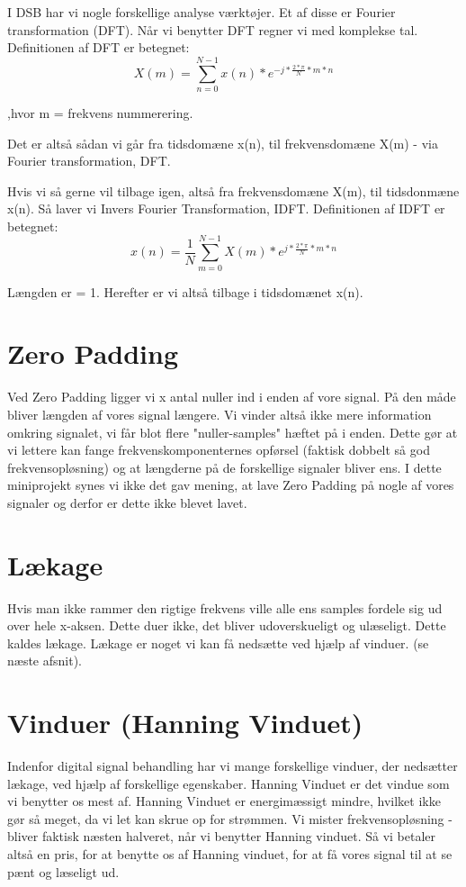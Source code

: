 \documentclass[12pt, letterpaper]{article}
\begin{document}
I DSB har vi nogle forskellige analyse værktøjer. Et af disse er Fourier transformation (DFT). Når vi benytter DFT regner vi med komplekse tal. 
Definitionen af DFT er betegnet: 
$$X(m)= \sum\limits_{n=0}^{N-1} x(n)*e^{-j*\frac{2*\pi}{N}*m*n}$$

,hvor m = frekvens nummerering. 


Det er altså sådan vi går fra tidsdomæne x(n), til frekvensdomæne X(m) - via Fourier transformation, DFT. 

Hvis vi så gerne vil tilbage igen, altså fra frekvensdomæne X(m), til tidsdonmæne x(n). Så laver vi Invers Fourier Transformation, IDFT. 
Definitionen af IDFT er betegnet: 
$$x(n)= \frac{1}{N} \sum\limits_{m=0}^{N-1} X(m)*e^{j*\frac{2*\pi}{N}*m*n}$$

Længden er = 1. 
Herefter er vi altså tilbage i tidsdomænet x(n).

\section{Zero Padding}
Ved Zero Padding ligger vi x antal nuller ind i enden af vore signal. På den måde bliver længden af vores signal længere. Vi vinder altså ikke mere information omkring signalet, vi får blot flere "nuller-samples" hæftet på i enden. 
Dette gør at vi lettere kan fange frekvenskomponenternes opførsel (faktisk dobbelt så god frekvensopløsning) og at længderne på de forskellige signaler bliver ens. 
I dette miniprojekt synes vi ikke det gav mening, at lave Zero Padding på nogle af vores signaler og derfor er dette ikke blevet lavet. 

\section{Lækage}
Hvis man ikke rammer den rigtige frekvens ville alle ens samples fordele sig ud over hele x-aksen. Dette duer ikke, det bliver udoverskueligt og ulæseligt. Dette kaldes lækage. Lækage er noget vi kan få nedsætte ved hjælp af vinduer. (se næste afsnit). 

\section{Vinduer (Hanning Vinduet)}
Indenfor digital signal behandling har vi mange forskellige vinduer, der nedsætter lækage, ved hjælp af forskellige egenskaber. 
Hanning Vinduet er det vindue som vi benytter os mest af. 
Hanning Vinduet er energimæssigt mindre, hvilket ikke gør så meget, da vi let kan skrue op for strømmen. 
Vi mister frekvensopløsning - bliver faktisk næsten halveret, når vi benytter Hanning vinduet. Så vi betaler altså en pris, for at benytte os af Hanning vinduet, for at få vores signal til at se pænt og læseligt ud. 
\end{document}
